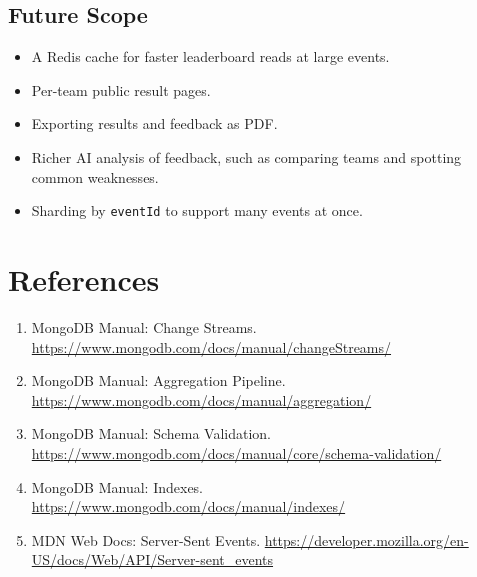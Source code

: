 \documentclass[11pt,a4paper]{article}
\begin{document}
\subsection{Future Scope}
\begin{itemize}
  \item A Redis cache for faster leaderboard reads at large events.
  \item Per-team public result pages.
  \item Exporting results and feedback as PDF.
  \item Richer AI analysis of feedback, such as comparing teams and spotting common weaknesses.
  \item Sharding by \texttt{eventId} to support many events at once.
\end{itemize}

\section*{References}
\begin{enumerate}
  \item MongoDB Manual: Change Streams. \url{https://www.mongodb.com/docs/manual/changeStreams/}
  \item MongoDB Manual: Aggregation Pipeline. \url{https://www.mongodb.com/docs/manual/aggregation/}
  \item MongoDB Manual: Schema Validation. \url{https://www.mongodb.com/docs/manual/core/schema-validation/}
  \item MongoDB Manual: Indexes. \url{https://www.mongodb.com/docs/manual/indexes/}
  \item MDN Web Docs: Server-Sent Events. \url{https://developer.mozilla.org/en-US/docs/Web/API/Server-sent_events}
\end{enumerate}
\end{document}
